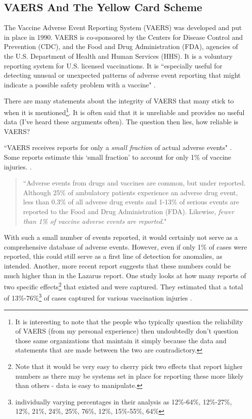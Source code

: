 \documentclass[10pt, a4paper, twocolumn]{book}
\begin{document}
\subsection{VAERS And The Yellow Card Scheme}

The Vaccine Adverse Event Reporting System (VAERS) was developed and put in place in 1990. VAERS is co-sponsored by the Centers for Disease Control and Prevention (CDC), and the Food and Drug Administration (FDA), agencies of the U.S. Department of Health and Human Services (HHS). It is a voluntary reporting system for U.S. licensed vaccinations. It is ``especially useful for detecting unusual or unexpected patterns of adverse event reporting that might indicate a possible safety problem with a vaccine" \citep{VAERS}.

There are many statements about the integrity of VAERS that many stick to when it is mentioned\footnote{It is interesting to note that the people who typically question the reliability of VAERS (from my personal experience) then undoubtedly don't question those same organizations that maintain it simply because the data and statements that are made between the two are contradictory.}. It is often said that it is unreliable and provides no useful data (I've heard these arguments often). The question then lies, how reliable is VAERS?

``VAERS receives reports for only a \textit{small fraction} of actual adverse events" \citep{VAERS}. Some reports estimate this `small fraction' to account for only 1\% of vaccine injuries. \citep{VAERSElectronicSupport}.

\begin{quotation}
	``Adverse events from drugs and vaccines are common, but under reported. Although 25\% of ambulatory patients experience an adverse drug event, less than 0.3\% of all adverse drug events and 1-13\% of serious events are reported to the Food and Drug Administration (FDA). Likewise, \textit{fewer than 1\% of vaccine adverse events are reported}." \citep{VAERSElectronicSupport}
\end{quotation} 

With such a small number of events reported, it would certainly not serve as a comprehensive database of adverse events. However, even if only 1\% of cases were reported, this could still serve as a first line of detection for anomalies, as intended. Another, more recent report suggests that these numbers could be much higher than in the Lazarus report. One study looks at how many reports of two specific effects\footnote{Note that it would be very easy to cherry pick two effects that report higher numbers as there may be systems set in place for reporting these more likely than others - data is easy to manipulate.} that existed and were captured. They estimated that a total of 13\%-76\%\footnote{individually varying percentages in their analysis as 12\%-64\%, 12\%-27\%, 12\%, 21\%, 24\%, 25\%, 76\%, 12\%, 15\%-55\%, 64\%} of cases captured for various vaccination injuries \citep{VAERSReportingSensitivity}.
\end{document}
